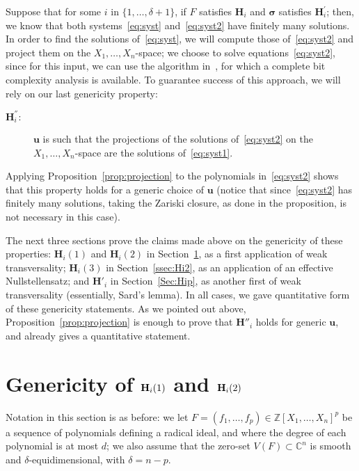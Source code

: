 \documentclass[12pt]{article}
\newcommand{\ZZ}{{\mathbb{Z}}}
\def\C{\mathbb{C}}
\begin{document}
Suppose that for some $i$ in $\{1,\dots,\delta+1\}$, if $F$ satisfies
$\bm H_i$ and $\bm \sigma$ satisfies $\bm H_i^{'}$; then, we know that
both systems~\eqref{eq:syst} and~\eqref{eq:syst2} have finitely many
solutions. In order to find the solutions of~\eqref{eq:syst}, we will
compute those of~\eqref{eq:syst2} and project them on the
$X_1,\dots,X_n$-space; we choose to solve equations~\eqref{eq:syst2},
since for this input, we can use the algorithm in~\cite{SH}, for which
a complete bit complexity analysis is available. To guarantee success
of this approach, we will rely on our last genericity property:
\begin{description}
\item [$\bm H^{''}_i:$] $\bm u$ is such that the projections of the
  solutions of~\eqref{eq:syst2} on the $X_1,\dots,X_n$-space are the
  solutions of~\eqref{eq:syst1}.
\end{description}
Applying Proposition~\ref{prop:projection} to the polynomials
in~\eqref{eq:syst2} shows that this property holds for a generic
choice of $\bm u$ (notice that since~\eqref{eq:syst2} has finitely
many solutions, taking the Zariski closure, as done in the
proposition, is not necessary in this case).

The next three sections prove the claims made above on the genericity
of these properties: $\bm H_i(1)$ and $\bm H_i(2)$ in
Section~\ref{sec:applications}, as a first application of weak
transversality; $\bm H_i(3)$ in Section~\ref{ssec:Hi2}, as an
application of an effective Nullstellensatz; and $\bm H'_i$ in
Section~\ref{Sec:Hip}, as another first of weak transversality
(essentially, Sard's lemma). In all cases, we gave quantitative form
of these genericity statements. As we pointed out above,
Proposition~\ref{prop:projection} is enough to prove that $\bm H''_i$
holds for generic $\bm u$, and already gives a quantitative statement.


\section{Genericity of ${\bf H}_i(1)$ and ${\bf H}_i(2)$}
\label{sec:applications}

Notation in this section is as before: we let $F=(f_1,\hdots,f_p) \in
\ZZ[X_1,\hdots,X_n]^p$ be a sequence of polynomials defining a radical
ideal, and where the degree of each polynomial is at most $d$; we 
also assume that the zero-set $V(F) \subset \C^n$ is smooth 
and $\delta$-equidimensional, with $\delta=n-p$. 
\end{document}

